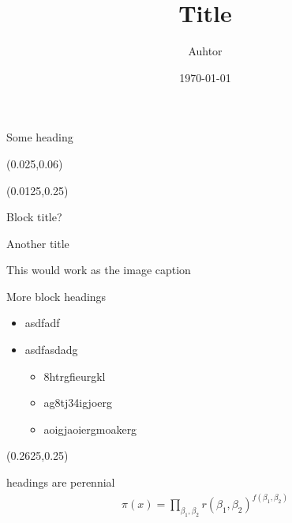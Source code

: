 \documentclass[final]{beamer}
\title{Title}
\author{Auhtor}
\institute[Inst]{Insitute}
\date{\today}
\begin{document}
\begin{frame}{\hfill Some heading} 
  \begin{textblock}{0.45}(0.025,0.06)
  \centering
    \begin{block}{}
      \centering
      \maketitle
    \end{block}
  \end{textblock}
  
  \begin{textblock}{0.225}(0.0125,0.25)
    \begin{block}{Block title?}
      \lipsum[1]
    \end{block}
    \vfill
    \begin{block}{Another title}
      \centering
      \begin{flushleft}
      This would work as the image caption
    \end{flushleft}
    \end{block}
    \vfill
    \begin{block}{More block headings}
      \lipsum[3]
      \begin{itemize}
      \item
        asdfadf
      \item
        asdfasdadg
        \begin{itemize}
        \item
          8htrgfieurgkl
        \item
          ag8tj34igjoerg
        \item
         aoigjaoiergmoakerg
        \end{itemize}
      \end{itemize}
    \end{block}

  \end{textblock}

  \begin{textblock}{0.225}(0.2625,0.25)
    \begin{block}{headings are perennial}
      \begin{gather}
        \pi(x)=\prod_{\beta_1,\beta_2}{r(\beta_1,\beta_2)^{f(\beta_1,\beta_2)}}\nonumber
      \end{gather}


\end{block}
\end{textblock}
\end{frame}
\end{document}
